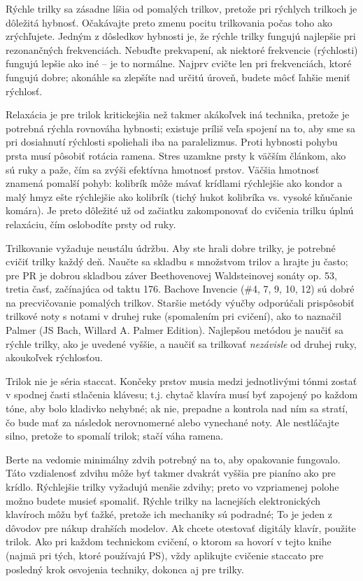 \documentclass[11pt,a4paper]{book}
\begin{document}
Rýchle trilky sa zásadne líšia od pomalých trilkov, pretože pri rýchlych trilkoch je dôležitá hybnosť. Očakávajte preto zmenu pocitu trilkovania počas toho ako zrýchľujete. Jedným z dôsledkov hybnosti je, že rýchle trilky fungujú najlepšie pri rezonančných frekvenciách. Nebuďte prekvapení, ak niektoré frekvencie (rýchlosti) fungujú lepšie ako iné -- je to normálne. Najprv cvičte len pri frekvenciách, ktoré fungujú dobre; akonáhle sa zlepšíte nad určitú úroveň, budete môcť ľahšie meniť rýchlosť.

Relaxácia je pre trilok kritickejšia než takmer akákoľvek iná technika, pretože je potrebná rýchla rovnováha hybnosti; existuje príliš veľa spojení na to, aby sme sa pri dosiahnutí rýchlosti spoliehali iba na paralelizmus. Proti hybnosti pohybu prsta musí pôsobiť rotácia ramena. Stres uzamkne prsty k väčším článkom, ako sú ruky a paže, čím sa zvýši efektívna hmotnosť prstov. Väčšia hmotnosť znamená pomalší pohyb: kolibrík môže mávať krídlami rýchlejšie ako kondor a malý hmyz ešte rýchlejšie ako kolibrík (tichý hukot kolibríka vs. vysoké kňučanie komára). Je preto dôležité už od začiatku zakomponovať do cvičenia trilku úplnú relaxáciu, čím oslobodíte prsty od ruky.

Trilkovanie vyžaduje neustálu údržbu. Aby ste hrali dobre trilky, je potrebné cvičiť trilky každý deň. Naučte sa skladbu s množstvom trilov a hrajte ju často; pre PR je dobrou skladbou záver Beethovenovej Waldsteinovej sonáty op. 53, tretia časť, začínajúca od taktu 176. Bachove Invencie (\#4, 7, 9, 10, 12) sú dobré na precvičovanie pomalých trilkov. Staršie metódy výučby odporúčali prispôsobiť trilkové noty s notami v druhej ruke (spomalením pri cvičení), ako to naznačil Palmer (JS Bach, Willard A. Palmer Edition). Najlepšou metódou je naučiť sa rýchle trilky, ako je uvedené vyššie, a naučiť sa trilkovať \emph{nezávisle} od druhej ruky, akoukoľvek rýchlosťou.

Trilok nie je séria staccat. Končeky prstov musia medzi jednotlivými tónmi zostať v spodnej časti stlačenia klávesu; t.j. chytač klavíra musí byť zapojený po každom tóne, aby bolo kladivko nehybné; ak nie, prepadne a kontrola nad ním sa stratí, čo bude mať za následok nerovnomerné alebo vynechané noty. Ale nestláčajte silno, pretože to spomalí trilok; stačí váha ramena.

Berte na vedomie minimálny zdvih potrebný na to, aby opakovanie fungovalo. Táto vzdialenosť zdvihu môže byť takmer dvakrát vyššia pre pianíno ako pre krídlo. Rýchlejšie trilky vyžadujú menšie zdvihy; preto vo vzpriamenej polohe možno budete musieť spomaliť. Rýchle trilky na lacnejších elektronických klavíroch môžu byť ťažké, pretože ich mechaniky sú podradné; To je jeden z dôvodov pre nákup drahších modelov. Ak chcete otestovať digitály klavír, použite trilok. Ako pri každom technickom cvičení, o ktorom sa hovorí v tejto knihe (najmä pri tých, ktoré používajú PS), vždy aplikujte cvičenie staccato pre posledný krok osvojenia techniky, dokonca aj pre trilky.
\end{document}
